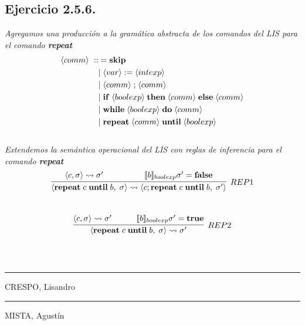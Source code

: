 \documentclass[a4paper,10pt]{article}
\begin{document}
\subsection*{Ejercicio 2.5.6.}
	\emph{Agregamos una producción a la gramática abstracta de los comandos del LIS para el comando {\bf repeat}}
	\\
	\begin{alignat*}{3}
		\langle comm \rangle\ ::&= {\bf skip} \\
			&|\;\langle var  \rangle  \;{:=}\;\langle intexp \rangle\\
			&|\;\langle comm \rangle  \;{;}\;\langle comm \rangle\\
			&|\;{\bf if}\;\langle boolexp \rangle\;{\bf then}\;\langle comm \rangle\;{\bf else}\;\langle comm \rangle\\
			&|\;{\bf while}\;\langle boolexp \rangle\;{\bf do}\;\langle comm \rangle\\
			&|\;{\bf repeat}\;\langle comm \rangle\;{\bf until}\;\langle boolexp \rangle
	\end{alignat*}
	\\
	\emph{Extendemos la semántica operacional del LIS con reglas de inferencia para el comando {\bf repeat}}
	\\
	\begin{align*}
		\infer[REP1]{
			\langle {\bf repeat}\; c\;{\bf until}\; b,\;\sigma\rangle \rightsquigarrow \langle c; {\bf repeat}\; c\;{\bf until}\; b,\;\sigma'\rangle
		}{
			\langle c, \sigma\rangle \rightsquigarrow \sigma'
			\qquad & \qquad 
			[\![b]\!]_{boolexp}\sigma' = {\bf false} 
		}
	\end{align*}
	\\
	\begin{align*}
		\infer[REP2]{
			\langle {\bf repeat}\; c\;{\bf until}\; b,\;\sigma\rangle \rightsquigarrow \sigma'
		}{
			\langle c, \sigma\rangle \rightsquigarrow \sigma'
			\quad & \quad  
			[\![b]\!]_{boolexp}\sigma' = {\bf true} 
		}
	\end{align*}
	\\ 
\pagebreak
\\
\vspace{\fill}
\begin{multicols}{2}
	\hrule
	\vspace{5pt}
	CRESPO, Lisandro \\
	\linebreak

	\hrule
	\vspace{5pt}
	MISTA, Agustín \\
\end{multicols}
\end{document}
